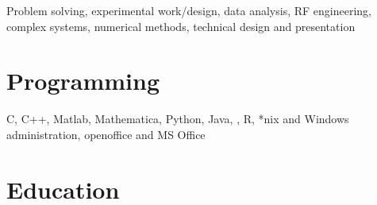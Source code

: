 \documentclass[margin,line]{resume}
\begin{document}
\begin{resume}
Problem solving, experimental work/design, data analysis, RF engineering, complex systems, numerical methods, technical design and presentation


    \section{\mysidestyle Programming} 

    C, C++, Matlab, Mathematica, Python, Java, \LaTeXe, R, *nix and Windows administration, openoffice and MS Office


    \section{\mysidestyle Education}


\end{resume}
\end{document}
